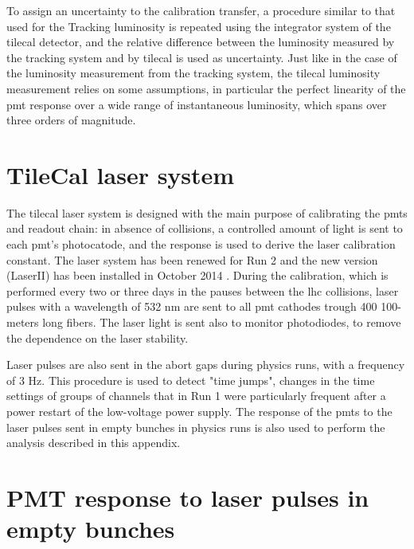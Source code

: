 To assign an uncertainty to the calibration transfer, a 
procedure similar to that used for the Tracking luminosity 
is repeated using the 
integrator system of the \gls{tilecal} detector, and the relative difference between the luminosity measured by the tracking system and 
by \gls{tilecal}  is used as uncertainty. 
Just like in the case of the luminosity measurement from the tracking system, the \gls{tilecal} luminosity measurement 
relies on some assumptions, in particular the perfect linearity of the \gls{pmt} response over a wide range of instantaneous luminosity, 
which spans over three orders of magnitude. 


\section{TileCal laser system}
\label{sec:app:laser}

The \gls{tilecal} laser system \cite{system:2016tae} is designed with the main purpose of calibrating the \glspl{pmt} and readout chain: 
in absence of collisions, a controlled amount of light is sent to each \gls{pmt}'s photocatode, 
and the response is used to derive the laser calibration constant. 
The laser system has been renewed for Run 2 and the new version (LaserII)
has been installed in October 2014 \cite{Scuri:2016ctn-2}. 
During the calibration, which is performed every two or three days in the 
pauses between the \gls{lhc} collisions,
laser pulses with a wavelength of 532 nm are sent to all \gls{pmt} cathodes 
trough 400 100-meters long fibers. 
The laser light is sent also to monitor photodiodes, to remove the dependence on the laser stability. 

Laser pulses are also sent in the abort gaps during physics runs, with a frequency of 
3 Hz. 
This procedure is used to detect "time jumps", changes in the time settings of groups of channels 
that in Run 1 were particularly frequent after a power restart of the low-voltage power
supply.
The response of the \glspl{pmt} to the laser pulses sent in empty bunches in physics runs 
is also used to perform the analysis described in this appendix. 


\section{PMT response to laser pulses in empty bunches}
\label{sec:app:pmtresponse}

